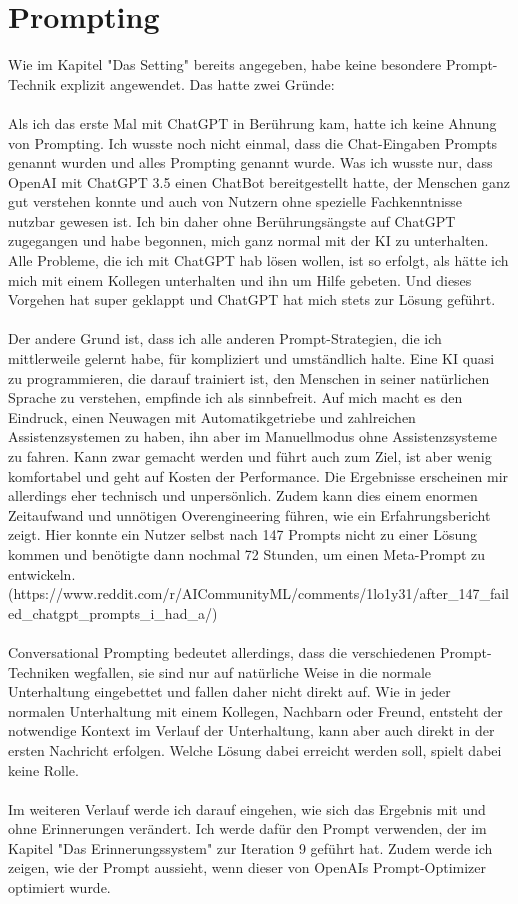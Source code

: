 	

\section*{Prompting}
Wie im Kapitel "Das Setting" bereits angegeben, habe keine besondere Prompt-Technik explizit angewendet. Das hatte zwei Gründe:\\
\\
Als ich das erste Mal mit ChatGPT in Berührung kam, hatte ich keine Ahnung von Prompting. Ich wusste noch nicht einmal, dass die Chat-Eingaben Prompts genannt wurden und alles Prompting genannt wurde. Was ich wusste nur, dass OpenAI mit ChatGPT 3.5 einen ChatBot bereitgestellt hatte, der Menschen ganz gut verstehen konnte und auch von Nutzern ohne spezielle Fachkenntnisse nutzbar gewesen ist. Ich bin daher ohne Berührungsängste auf ChatGPT zugegangen und habe begonnen, mich ganz normal mit der KI zu unterhalten. Alle Probleme, die ich mit ChatGPT hab lösen wollen, ist so erfolgt, als hätte ich mich mit einem Kollegen unterhalten und ihn um Hilfe gebeten. Und dieses Vorgehen hat super geklappt und ChatGPT hat mich stets zur Lösung geführt.\\
\\
Der andere Grund ist, dass ich alle anderen Prompt-Strategien, die ich mittlerweile gelernt habe, für kompliziert und umständlich halte. Eine KI quasi zu programmieren, die darauf trainiert ist, den Menschen in seiner natürlichen Sprache zu verstehen, empfinde ich als sinnbefreit. Auf mich macht es den Eindruck, einen Neuwagen mit Automatikgetriebe und zahlreichen Assistenzsystemen zu haben, ihn aber im Manuellmodus ohne Assistenzsysteme zu fahren. Kann zwar gemacht werden und führt auch zum Ziel, ist aber wenig komfortabel und geht auf Kosten der Performance. Die Ergebnisse erscheinen mir allerdings eher technisch und unpersönlich. Zudem kann dies einem enormen Zeitaufwand und unnötigen Overengineering führen, wie ein Erfahrungsbericht zeigt. Hier konnte ein Nutzer selbst nach 147 Prompts nicht zu einer Lösung kommen und benötigte dann nochmal 72 Stunden, um einen Meta-Prompt zu entwickeln. (https://www.reddit.com/r/AICommunityML/comments/1lo1y31/after_147_failed_chatgpt_prompts_i_had_a/) \\

\\
Conversational Prompting bedeutet allerdings, dass die verschiedenen Prompt-Techniken wegfallen, sie sind nur auf natürliche Weise in die normale Unterhaltung eingebettet und fallen daher nicht direkt auf. Wie in jeder normalen Unterhaltung mit einem Kollegen, Nachbarn oder Freund, entsteht der notwendige Kontext im Verlauf der Unterhaltung, kann aber auch direkt in der ersten Nachricht erfolgen. Welche Lösung dabei erreicht werden soll, spielt dabei keine Rolle.\\
\\
Im weiteren Verlauf werde ich darauf eingehen, wie sich das Ergebnis mit und ohne Erinnerungen verändert. Ich werde dafür den Prompt verwenden, der im Kapitel "Das Erinnerungssystem" zur Iteration 9 geführt hat. Zudem werde ich zeigen, wie der Prompt aussieht, wenn dieser von OpenAIs Prompt-Optimizer optimiert wurde.

